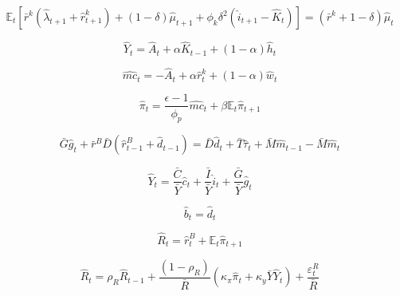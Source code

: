 \documentclass[11pt,preprint]{elsarticle}
\numberwithin{equation}{section}
\numberwithin{figure}{section}
\numberwithin{table}{section}
\begin{document}
\begin{equation}\label{foc_K_linearised}
\mathbb{E}_t \left[ \bar{r}^k (\hat{\lambda}_{t+1} + \hat{r}^k_{t+1}) + (1-\delta) \hat{\mu}_{t+1} + \phi_k \delta^2 (\hat{i}_{t+1} - \hat{K}_t) \right] = (\bar{r}^k + 1 - \delta) \hat{\mu}_t
\end{equation}

\begin{equation}\label{aggregate_production_linearised}
\hat{Y}_t = \hat{A}_t + \alpha \hat{K}_{t-1} + (1-\alpha) \hat{h}_t
\end{equation}

\begin{equation}\label{marginal_cost_linearised}
\widehat{mc}_t = -\hat{A}_t + \alpha \hat{r}^k_t + (1-\alpha) \hat{w}_t
\end{equation}

\begin{equation}\label{nkpc_linearised}
\hat{\pi}_t = \frac{\epsilon-1}{\phi_p} \widehat{mc}_t + \beta \mathbb{E}_t \hat{\pi}_{t+1}
\end{equation}

\begin{equation}\label{Gov_Budget_linearised}
\bar{G} \hat{g}_t + \bar{r}^B \bar{D} (\hat{r}^B_{t-1} + \hat{d}_{t-1}) = \bar{D} \hat{d}_t + \bar{T} \hat{\tau}_t + \bar{M} \hat{m}_{t-1} - \bar{M} \hat{m}_t
\end{equation}

\begin{equation}\label{clearing_resource_constraint_linearised}
\hat{Y}_t = \frac{\bar{C}}{\bar{Y}} \hat{c}_t + \frac{\bar{I}}{\bar{Y}} \hat{i}_t + \frac{\bar{G}}{\bar{Y}} \hat{g}_t
\end{equation}

\begin{equation}\label{Bond_market_clear_linearised}
\hat{b}_t = \hat{d}_t
\end{equation}

\begin{equation}\label{fisher_linearised}
\hat{R}_t = \hat{r}^B_t + \mathbb{E}_t \hat{\pi}_{t+1}
\end{equation}

\begin{equation}\label{taylor_rule_linearised}
\hat{R}_t = \rho_R \hat{R}_{t-1} + \frac{(1 - \rho_R)}{\bar{R}} \left( \kappa_\pi \hat{\pi}_t + \kappa_y \bar{Y} \hat{Y}_t \right) + \frac{\varepsilon_t^R}{\bar{R}}
\end{equation}
\end{document}
